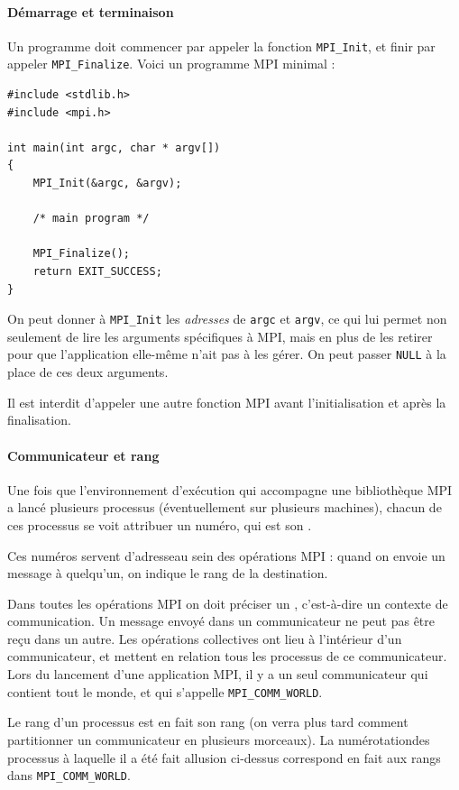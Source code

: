 \paragraph{Démarrage et terminaison} Un programme doit commencer par
appeler la fonction \texttt{MPI\_Init}, et finir par appeler
\texttt{MPI\_Finalize}. Voici un programme MPI minimal :

\begin{verbatim}
#include <stdlib.h>
#include <mpi.h>

int main(int argc, char * argv[])
{
    MPI_Init(&argc, &argv);

    /* main program */

    MPI_Finalize();
    return EXIT_SUCCESS;
}
\end{verbatim}

On peut donner à \texttt{MPI\_Init} les \emph{adresses} de \texttt{argc} et
\texttt{argv}, ce qui lui permet non seulement de lire les arguments spécifiques
à MPI, mais en plus de les retirer pour que l'application elle-même n'ait pas à
les gérer. On peut passer \texttt{NULL} à la place de ces deux arguments.

Il est interdit d'appeler une autre fonction MPI avant l'initialisation et après
la finalisation.

\paragraph{Communicateur et rang} Une fois que l'environnement
d'exécution qui accompagne une bibliothèque MPI a lancé plusieurs
processus (éventuellement sur plusieurs machines), chacun de ces
processus se voit attribuer un numéro, qui est son .

Ces numéros servent \og d'adresse\fg au sein des opérations MPI :
quand on envoie un message à quelqu'un, on indique le rang de la
destination.

Dans toutes les opérations MPI on doit préciser un
, c'est-à-dire un \og contexte de
communication\fg. Un message envoyé dans un communicateur ne peut pas
être reçu dans un autre. Les opérations collectives ont lieu à
l'intérieur d'un communicateur, et mettent en relation tous les
processus de ce communicateur. Lors du lancement d'une application
MPI, il y a un seul communicateur qui contient tout le monde, et qui
s'appelle \texttt{MPI\_COMM\_WORLD}.

Le rang d'un processus est en fait son rang  (on verra plus tard comment partitionner un
communicateur en plusieurs morceaux). La \og numérotation\fg des
processus à laquelle il a été fait allusion ci-dessus correspond en
fait aux rangs dans \texttt{MPI\_COMM\_WORLD}.

